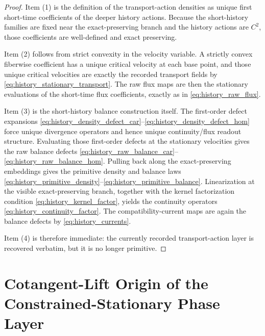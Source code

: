 \documentclass[11pt]{article}
\begin{document}
\begin{proof}
Item (1) is the definition of the transport-action densities as unique first short-time coefficients of the deeper history actions. Because the short-history families are fixed near the exact-preserving branch and the history actions are \(C^2\), those coefficients are well-defined and exact preserving.

Item (2) follows from strict convexity in the velocity variable. A strictly convex fiberwise coefficient has a unique critical velocity at each base point, and those unique critical velocities are exactly the recorded transport fields by \eqref{eq:history_stationary_transport}. The raw flux maps are then the stationary evaluations of the short-time flux coefficients, exactly as in \eqref{eq:history_raw_flux}.

Item (3) is the short-history balance construction itself. The first-order defect expansions \eqref{eq:history_density_defect_car}--\eqref{eq:history_density_defect_hom} force unique divergence operators and hence unique continuity/flux readout structure. Evaluating those first-order defects at the stationary velocities gives the raw balance defects \eqref{eq:history_raw_balance_car}--\eqref{eq:history_raw_balance_hom}. Pulling back along the exact-preserving embeddings gives the primitive density and balance laws \eqref{eq:history_primitive_density}--\eqref{eq:history_primitive_balance}. Linearization at the visible exact-preserving branch, together with the kernel factorization condition \eqref{eq:history_kernel_factor}, yields the continuity operators \eqref{eq:history_continuity_factor}. The compatibility-current maps are again the balance defects by \eqref{eq:history_currents}.

Item (4) is therefore immediate: the currently recorded transport-action layer is recovered verbatim, but it is no longer primitive.
\end{proof}

\section{Cotangent-Lift Origin of the Constrained-Stationary Phase Layer}
\end{document}
